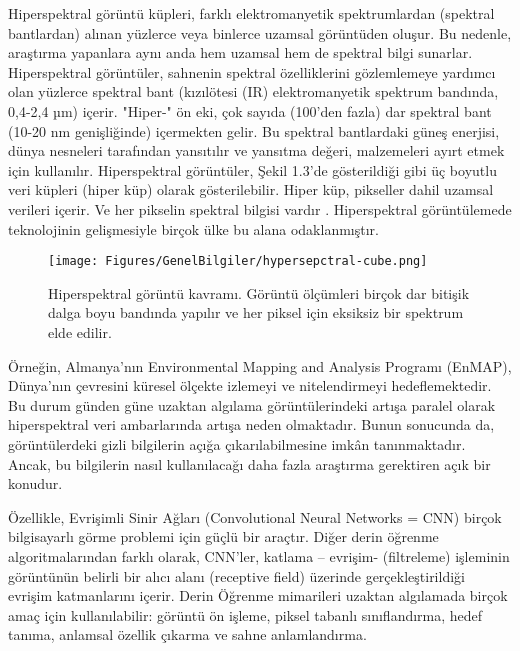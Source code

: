 Hiperspektral görüntü küpleri, farklı elektromanyetik spektrumlardan (spektral bantlardan)
alınan yüzlerce veya binlerce uzamsal görüntüden oluşur. Bu nedenle, araştırma yapanlara aynı
anda hem uzamsal hem de spektral bilgi sunarlar. Hiperspektral görüntüler, sahnenin spektral özelliklerini gözlemlemeye yardımcı olan yüzlerce spektral bant (kızılötesi (IR) elektromanyetik spektrum bandında, 0,4-2,4 µm) içerir. "Hiper-" ön eki, çok sayıda (100'den fazla) dar spektral bant (10-20 nm genişliğinde) içermekten gelir. Bu spektral bantlardaki güneş enerjisi, dünya nesneleri tarafından yansıtılır ve yansıtma değeri, malzemeleri ayırt etmek için kullanılır. Hiperspektral görüntüler, Şekil 1.3'de gösterildiği gibi üç boyutlu veri küpleri (hiper küp) olarak gösterilebilir. Hiper küp, pikseller dahil uzamsal verileri içerir. Ve her pikselin spektral bilgisi vardır \cite{ma2010local}. Hiperspektral görüntülemede teknolojinin gelişmesiyle birçok ülke bu alana odaklanmıştır.
\begin{figure}[!ht]
  \centering
  \texttt{[image: Figures/GenelBilgiler/hypersepctral-cube.png]}
  \caption{Hiperspektral görüntü kavramı. Görüntü ölçümleri birçok dar bitişik dalga boyu bandında yapılır ve her piksel için eksiksiz bir spektrum elde edilir. \cite{shippert2003introduction} }
\end{figure}
Örneğin, Almanya’nın Environmental Mapping and Analysis Programı (EnMAP), Dünya'nın
çevresini küresel ölçekte izlemeyi ve nitelendirmeyi hedeflemektedir. Bu durum günden güne
uzaktan algılama görüntülerindeki artışa paralel olarak hiperspektral veri ambarlarında artışa
neden olmaktadır. Bunun sonucunda da, görüntülerdeki gizli bilgilerin açığa çıkarılabilmesine
imkân tanınmaktadır. Ancak, bu bilgilerin nasıl kullanılacağı daha fazla araştırma gerektiren açık
bir konudur.



Özellikle, Evrişimli Sinir Ağları (Convolutional Neural Networks = CNN) \cite{lecun1999object} birçok bilgisayarlı
görme problemi için güçlü bir araçtır. Diğer derin öğrenme algoritmalarından farklı olarak,
CNN'ler, katlama – evrişim- (filtreleme) işleminin görüntünün belirli bir alıcı alanı (receptive
field) üzerinde gerçekleştirildiği evrişim katmanlarını içerir. Derin Öğrenme mimarileri uzaktan
algılamada birçok amaç için kullanılabilir: görüntü ön işleme, piksel tabanlı sınıflandırma, hedef
tanıma, anlamsal özellik çıkarma ve sahne anlamlandırma.


